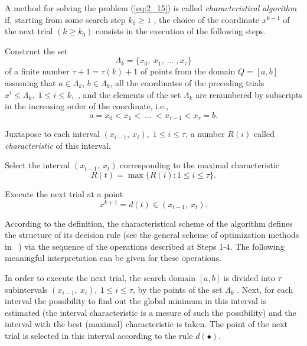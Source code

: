 \begin{definition}
\label{def:2_2}
A method for solving the problem (\ref{eq:2_15}) is called \textit{characteristical algorithm}  if, starting from some search step $k_0\geq 1$ , the choice of the coordinate $x^{k+1}$  of the next trial $(k\geq k_0)$  consists in the execution of the following steps.
\begin{description}
\item [\textbf{Step 1}]{Construct the set 
\begin{equation}
\label{eq:2_29}
\Lambda_k=\{x_0,\:x_1,\:\ldots\;,x_\tau\}
\end{equation}
of a finite number $\tau+1=\tau(k)+1$  of points from the domain $Q=[a,b]$  assuming that $a\in\Lambda_k$, $b\in\Lambda_k$, all the coordinates of the preceding trials $x^i\leq\Lambda_k,\;1\leq i\leq k,$ , and the elements of the set $\Lambda_k$  are renumbered by subscripts in the increasing order of the coordinate, i.e.,
\begin{equation}
\label{eq:2_30}
a=x_0<x_1<\:\ldots\:<x_{\tau-1}<x_\tau=b.
\end{equation}
}%
\item [\textbf{Step 2}]{Juxtapose to each interval $(x_{i-1},\:x_i),\;1\leq i\leq \tau$, a number $R(i)$ called  \textit{characteristic}  of this interval.
}%
\item [\textbf{Step 3}]{Select the interval $(x_{t-1},\:x_t)$ corresponding to the maximal characteristic 
\begin{equation}
\label{eq:2_31}
R(t)=\max\{R(i):1\leq i\leq \tau\}.
\end{equation}
}%
\item [\textbf{Step 4}]{Execute the next trial at a point
\begin{equation}
\label{eq:2_32}
x^{k+1}=d(t)\in (x_{t-1},\:x_t).
\end{equation}
}%
\end{description}
\end{definition}
According to the definition, the characteristical scheme of the algorithm defines the structure of its decision rule (see the general scheme of optimization methods in  ~\cite{2_GriSergChap1}) via the sequence of the operations described at Steps 1-4. The following meaningful interpretation can be given for these operations. 

In order to execute the next trial, the search domain $[a,b]$ is divided into $\tau$ subintervals $(x_{i-1},\:x_i),\:1\leq i\leq \tau$, by the points of the set $\Lambda_k$ . Next, for each interval the possibility to find out the global minimum in this interval is estimated (the interval characteristic is a mesure of such the possibility) and the interval with the best (maximal) characteristic is taken. The point of the next trial is selected in this interval according to the rule $d(\bullet)$.

